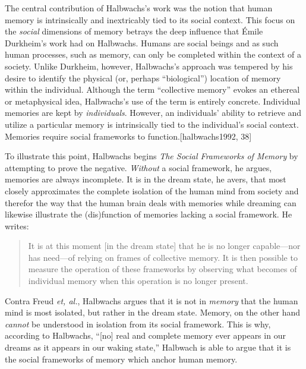 The central contribution of Halbwachs's work was the notion that human
memory is intrinsically and inextricably tied to its social context.
This focus on the \emph{social} dimensions of memory betrays the deep
influence that Émile Durkheim's work had on Halbwachs. Humans are social
beings and as such human processes, such as memory, can only be
completed within the context of a society. Unlike Durkheim, however,
Halbwachs's approach was tempered by his desire to identify the physical
(or, perhaps ``biological'') location of memory within the individual.
Although the term ``collective memory'' evokes an ethereal or
metaphysical idea, Halbwachs's use of the term is entirely concrete.
Individual memories are kept by \emph{individuals}. However, an
individuals' ability to retrieve and utilize a particular memory is
intrinsically tied to the individual's social context. Memories require
social frameworks to function.{[}halbwachs1992, 38{]}

To illustrate this point, Halbwachs begins \emph{The Social Frameworks
of Memory} by attempting to prove the negative. \emph{Without} a social
framework, he argues, memories are always incomplete. It is in the dream
state, he avers, that most closely approximates the complete isolation
of the human mind from society and therefor the way that the human brain
deals with memories while dreaming can likewise illustrate the
(dis)function of memories lacking a social framework. He writes:

\begin{quote}
It is at this moment {[}in the dream state{]} that he is no longer
capable---nor has need---of relying on frames of collective memory. It
is then possible to measure the operation of these frameworks by
observing what becomes of individual memory when this operation is no
longer present.\autocite[39]{halbwachs1992}
\end{quote}

Contra Freud \emph{et, al.}, Halbwachs argues that it is not in
\emph{memory} that the human mind is most isolated, but rather in the
dream state. Memory, on the other hand \emph{cannot} be understood in
isolation from its social framework. This is why, according to
Halbwachs, ``{[}no{]} real and complete memory ever appears in our
dreams as it appears in our waking state,''\autocite[41]{halbwachs1992}
Halbwach is able to argue that it is the social frameworks of memory
which anchor human memory.
